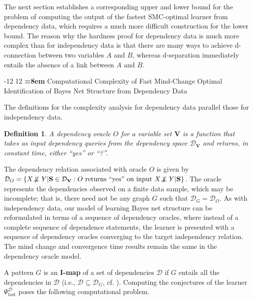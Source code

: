 \documentclass{elsarticle}%
\makeatletter
\renewcommand\section{\@startsection {section}{1}{\z@}%
  {-12\p@ \@plus -4\p@ \@minus -4\p@}%
                       {12\p@ \@plus 4\p@ \@minus 4\p@}%
                                   {\normalfont\large\bfseries\boldmath
                                   \rightskip=\z@ \@plus 8em\pretolerance=10000 }}
\newtheorem{definition}[theorem]{Definition}
\newcommand{\dep}{\ensuremath{{\perp{}\!\!\!\!\!\!\!\not  \perp{}}}}
\newcommand{\A}{A}
\newcommand{\B}{B}
\newcommand{\G}{G}
\newcommand{\fast}{\mathrm{fast}}
\newcommand{\D}{\mathcal{D}}
\makeatother
\begin{document}
The next section establishes a corresponding upper and lower bound for the problem of computing the output of the fastest SMC-optimal learner from dependency data, which requires a much more difficult construction for the lower bound. The reason why the hardness proof for dependency data is much more complex than for independency data is that there are many ways to achieve d-connection between two variables $\A$ and $\B$, whereas d-separation immediately entails the absence of a link between $\A$ and $\B$.


\section{Computational Complexity of Fast Mind-Change Optimal Identification of Bayes Net Structure from Dependency Data}

The definitions for the complexity analysis for dependency data parallel those for independency data. 


\begin{definition}
  A dependency oracle $O$ for a variable set $\mathbf{V}$
  is a function that takes as input dependency queries
  from the dependency space $\D_{\mathbf{V}}$ and returns, in constant time, either ``yes'' or ``?''.
\end{definition}
%
The dependency relation associated with oracle $O$ is given by
$\D_O = \{X \dep Y |\mathbf{S} \in \D_{\mathbf{V}}:
O \linebreak[0]\mbox{ returns} \linebreak[0] \text{ ``yes'' on input }\linebreak[0]X \dep Y |\mathbf{S}\}$. The oracle represents the dependencies observed on a finite data sample, which may be incomplete; that is, there need not be any graph $\G$ such that $\D_{\G} = \D_{O}$. As with independency data, our model of learning Bayes net structure can be reformulated in terms of a sequence of dependency oracles, where instead of a complete sequence of dependence statements, the learner is presented with a sequence of dependency oracles converging to the target independency relation. The mind change and convergence time results remain the same in the dependency oracle model.

A pattern $\G$ is an \textbf{I-map} of a set of dependencies $\D$ if $\G$ entails all the dependencies in $\D$ (i.e., $\D \subseteq \D_{\G}$, cf. \cite{pearl88:_probab_reason_intel_system}).
Computing the conjectures of the 
learner $\Psi^{\D}_{\fast}$ poses the following computational problem. %
\end{document}
